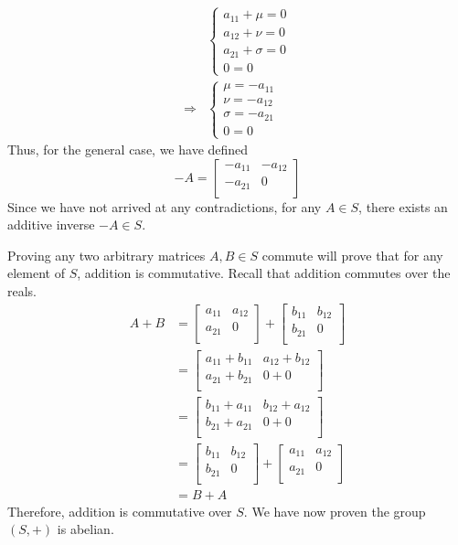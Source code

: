 \documentclass{article}
\begin{document}
\begin{align*}
  &\left\{\begin{array}{c}
    a_{11}+\mu=0\\
    a_{12}+\nu =0\\
    a_{21}+\sigma =0\\
    0=0   
  \end{array}\right.\\
  \Longrightarrow &\left\{\begin{array}{c}
    \mu=-a_{11} \\
    \nu =-a_{12}\\
    \sigma =-a_{21}\\
    0=0
  \end{array}\right.
\end{align*}
Thus, for the general case, we have defined 
\[
  -A=\begin{bmatrix}
    -a_{11}  &-a_{12}    \\
     -a_{21} &0   \\
  \end{bmatrix}
\]
Since we have not arrived at any contradictions, for any \(A\in S\), there exists an additive inverse \(-A\in S\).

Proving any two arbitrary matrices \(A,B\in S\)  commute will prove that for any element of \(S\), addition is commutative. Recall that addition commutes over the reals.
\begin{align*}
  A+B&=\begin{bmatrix}
    a_{11}  &a_{12}    \\
     a_{21} &0    \\
  \end{bmatrix}+\begin{bmatrix}
    b_{11}  &b_{12}    \\
     b_{21} &0    \\
  \end{bmatrix}\\
  &=\begin{bmatrix}
    a_{11}+b_{11}   &a_{12}+b_{12}     \\
     a_{21}+b_{21}  &0+0   \\
  \end{bmatrix}\\
  &=\begin{bmatrix}
    b_{11}+a_{11}   &b_{12}+a_{12}     \\
     b_{21}+a_{21}  &0+0   \\
  \end{bmatrix}\\
  &=\begin{bmatrix}
    b_{11}  &b_{12}    \\
     b_{21} &0   \\
  \end{bmatrix}+\begin{bmatrix}
    a_{11}  &a_{12}    \\
     a_{21} &0    \\
  \end{bmatrix}\\
  &=B+A
\end{align*}
Therefore, addition is commutative over \(S\). We have now proven the group \((S,+)\) is abelian.
\end{document}
